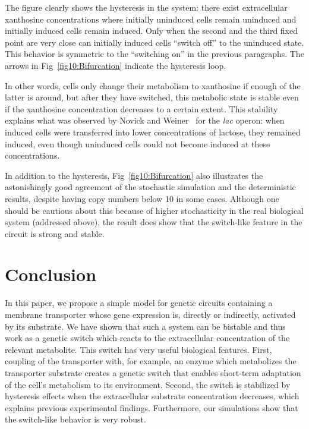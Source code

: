 \documentclass[10pt,letterpaper]{article}
\begin{document}
	The figure clearly shows the hysteresis in the system: there exist extracellular xanthosine concentrations where
	initially uninduced cells remain uninduced and initially induced cells remain induced. Only when the second and the third fixed point are very close can initially induced cells ``switch off'' to the uninduced state. This
	behavior is symmetric to the ``switching on'' in the previous paragraphs. The arrows in Fig~\ref{fig10:Bifurcation} indicate the hysteresis loop.
	
	In other words, cells only change their metabolism to xanthosine if
	enough of the latter is around, but after they have switched, this metabolic
	state is stable even if the xanthosine concentration decreases to a certain
	extent. This stability explains what was observed by Novick and
	Weiner~\cite{Novick1957} for the \emph{lac} operon: when induced cells were
	transferred into lower concentrations of lactose, they remained induced,
	even though uninduced cells could not become induced at these
	concentrations.
	
	In addition to the hysteresis, Fig~\ref{fig10:Bifurcation} also illustrates the astonishingly good agreement of the stochastic simulation and the deterministic results, despite having copy numbers below 10 in some cases. Although one should be cautious about this because of higher stochasticity in the real biological system (addressed above), the result does show that the switch-like feature in the circuit is strong and stable.
	
	
	\section*{Conclusion}
	In this paper, we propose a simple model for genetic circuits containing
	a membrane transporter whose gene expression is, directly or indirectly,
	activated by its substrate. We have shown that such a system can be bistable
	and thus work as a genetic switch which reacts to the extracellular
	concentration of the relevant metabolite. This switch has very useful
	biological features. First, coupling of the transporter with, for example, an
	enzyme which metabolizes the transporter substrate creates a genetic switch that enables short-term
	adaptation of the cell's metabolism to its environment. Second, the switch
	is stabilized by hysteresis effects when the extracellular substrate
	concentration decreases, which explains previous experimental findings.
	Furthermore, our simulations show that the switch-like behavior is very robust. 
	
\end{document}
